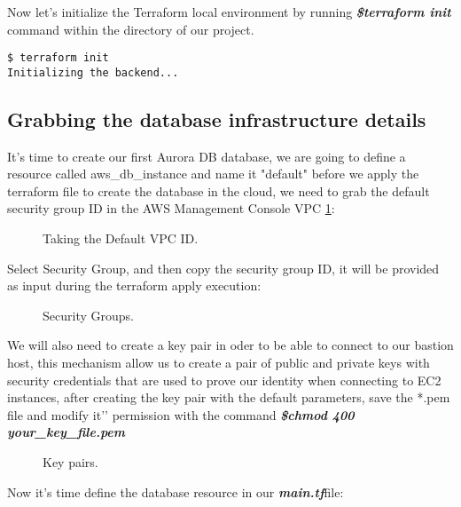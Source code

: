\documentclass{article}
\begin{document}
Now let's initialize the Terraform local environment by running \textbf{\emph{\$terraform init}} command within the directory of our project.
\begin{lstlisting}[caption=Initializing Terraform local environment]
$ terraform init
Initializing the backend...  
\end{lstlisting}

\clearpage

\subsection{Grabbing the database infrastructure details}

It’s time to create our first Aurora DB database,  we are going to define a resource called aws\_db\_instance and name it "default" before we apply the terraform file to create the database in the cloud, we need to grab the default security group ID in the AWS Management Console VPC \ref{fig:DefaultVPC}:

\begin{figure}[hbt!]
\centering
\caption{\label{fig:DefaultVPC} Taking the Default VPC ID.}
\end{figure}

Select Security Group, and then copy the security group ID, it will be provided as input during the terraform apply execution:

\begin{figure}[hbt!]
\centering
\caption{\label{fig:SecurityGroup} Security Groups.}
\end{figure}

We will also need to create a key pair in oder to be able to connect to our bastion host, this mechanism allow us to create a pair of public and private keys with security credentials that are used to prove our identity when connecting to EC2 instances, after creating the key pair with the default parameters, save the *.pem file and modify it'’ permission with the command \textbf{\emph{\$chmod 400 your\_key\_file.pem}}

\begin{figure}[hbt!]
\centering
\caption{\label{fig:KeyPairs} Key pairs.}
\end{figure}

Now it's time define the database resource in our \textbf{\emph{main.tf}}file:
\end{document}
